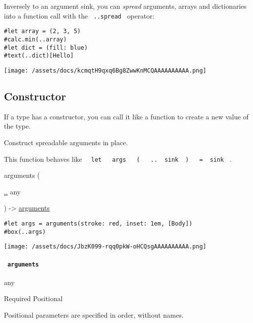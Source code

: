 Inversely to an argument sink, you can \emph{spread} arguments, arrays
and dictionaries into a function call with the \texttt{\ ..spread\ }
operator:

\begin{verbatim}
#let array = (2, 3, 5)
#calc.min(..array)
#let dict = (fill: blue)
#text(..dict)[Hello]
\end{verbatim}

\texttt{[image: /assets/docs/kcmqtH9qxq6Bg8ZwwKnMCQAAAAAAAAAA.png]}

\subsection{\texorpdfstring{Constructor
{}}{Constructor }}\label{constructor}

\label{constructor-constructor-tooltip}
If a type has a constructor, you can call it like a function to create a
new value of the type.

Construct spreadable arguments in place.

This function behaves like
\texttt{\ }{\texttt{\ let\ }}\texttt{\ }{\texttt{\ args\ }}\texttt{\ }{\texttt{\ (\ }}\texttt{\ }{\texttt{\ ..\ }}\texttt{\ sink\ }{\texttt{\ )\ }}\texttt{\ }{\texttt{\ =\ }}\texttt{\ sink\ }
.

{ arguments } (

{ \hyperref[constructor-parameters-arguments]{..} { any } }

) -\textgreater{}
\href{/docs/reference/foundations/arguments/}{arguments}

\begin{verbatim}
#let args = arguments(stroke: red, inset: 1em, [Body])
#box(..args)
\end{verbatim}

\texttt{[image: /assets/docs/JbzK099-rqq0pkW-oHCQsgAAAAAAAAAA.png]}

\paragraph{\texorpdfstring{\texttt{\ arguments\ }}{ arguments }}\label{constructor-arguments}

{ any }

{Required} {{ Positional }}

\label{constructor-arguments-positional-tooltip}
Positional parameters are specified in order, without names.

